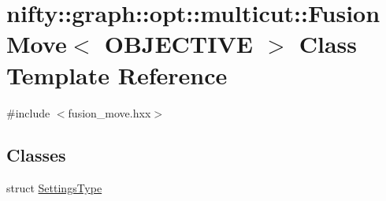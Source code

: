 \hypertarget{classnifty_1_1graph_1_1opt_1_1multicut_1_1FusionMove}{}\section{nifty\+:\+:graph\+:\+:opt\+:\+:multicut\+:\+:Fusion\+Move$<$ O\+B\+J\+E\+C\+T\+I\+VE $>$ Class Template Reference}
\label{classnifty_1_1graph_1_1opt_1_1multicut_1_1FusionMove}


{\ttfamily \#include $<$fusion\+\_\+move.\+hxx$>$}

\subsection*{Classes}
\begin{DoxyCompactItemize}
\item 
struct \hyperlink{structnifty_1_1graph_1_1opt_1_1multicut_1_1FusionMove_1_1SettingsType}{Settings\+Type}
\end{DoxyCompactItemize}
